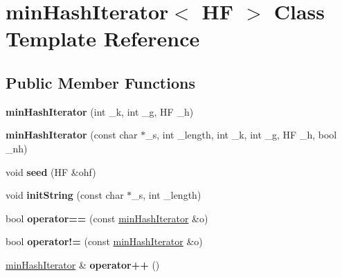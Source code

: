 \hypertarget{classminHashIterator}{}\section{min\+Hash\+Iterator$<$ HF $>$ Class Template Reference}
\label{classminHashIterator}
\subsection*{Public Member Functions}
\begin{DoxyCompactItemize}
\item 
\mbox{\label{classminHashIterator_a7398c027f13c43b1a2beeb7ca44097c9}} 
{\bfseries min\+Hash\+Iterator} (int \+\_\+k, int \+\_\+g, HF \+\_\+h)
\item 
\mbox{\label{classminHashIterator_ac9bafec65b113a4ea108ee5a390bcc95}} 
{\bfseries min\+Hash\+Iterator} (const char $\ast$\+\_\+s, int \+\_\+length, int \+\_\+k, int \+\_\+g, HF \+\_\+h, bool \+\_\+nh)
\item 
\mbox{\label{classminHashIterator_a64274c9d9bdf735770e529f6d80a8563}} 
void {\bfseries seed} (HF \&ohf)
\item 
\mbox{\label{classminHashIterator_af454dd7b9df64127e91ee905b772d764}} 
void {\bfseries init\+String} (const char $\ast$\+\_\+s, int \+\_\+length)
\item 
\mbox{\label{classminHashIterator_aae4150e842286226baca178c61e43e12}} 
bool {\bfseries operator==} (const \hyperlink{classminHashIterator}{min\+Hash\+Iterator} \&o)
\item 
\mbox{\label{classminHashIterator_a1c9248794d82a7fe9c40e771ff795980}} 
bool {\bfseries operator!=} (const \hyperlink{classminHashIterator}{min\+Hash\+Iterator} \&o)
\item 
\mbox{\label{classminHashIterator_a4942516f0997b83b78da2e73445db0e3}} 
\hyperlink{classminHashIterator}{min\+Hash\+Iterator} \& {\bfseries operator++} ()
\item 
\mbox{\label{classminHashIterator_addaea317b5922fddc7785c7e11e099f5}} 

\end{DoxyCompactItemize}
